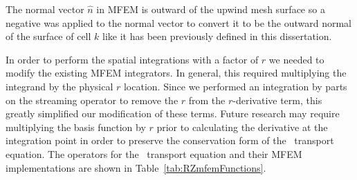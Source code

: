 \documentclass{article}
\begin{document}
The normal vector $\hat{n}$ in MFEM is outward of the upwind mesh surface so a negative was applied to the normal vector to convert it to be the outward normal of the surface of cell $k$ like it has been previously defined in this dissertation.

In order to perform the spatial integrations with a factor of $r$ we needed to modify the existing MFEM integrators. In general, this required multiplying the integrand by the physical $r$ location. Since we performed an integration by parts on the streaming operator to remove the $r$ from the $r$-derivative term, this greatly simplified our modification of these terms. Future research may require multiplying the basis function by $r$ prior to calculating the derivative at the integration point in order to preserve the conservation form of the \RZ\ transport equation. The operators for the \RZ\ transport equation and their MFEM implementations are shown in Table~\ref{tab:RZmfemFunctions}.
\end{document}
